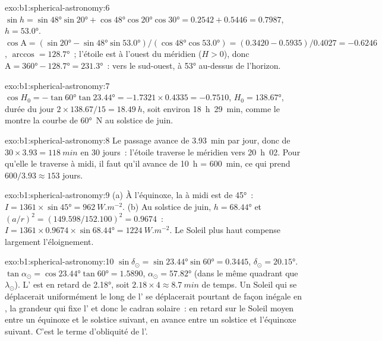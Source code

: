 \begin{solution}{exo:b1:spherical-astronomy:6}
$\sin h = \sin\ang{48}\sin\ang{20} + \cos\ang{48}\cos\ang{20}\cos\ang{30}
= 0.2542 + 0.5446 = 0.7987$, $h = \ang{53.0}$.
$\cos\mathrm{A} = (\sin\ang{20} - \sin\ang{48}\sin\ang{53.0})/(\cos\ang{48}
\cos\ang{53.0}) = (0.3420 - 0.5935)/0.4027 = -0.6246$, $\arccos = \ang{128.7}$~;
l'étoile est à l'ouest du méridien ($H > 0$), donc $\mathrm{A} = \ang{360} -
\ang{128.7} = \ang{231.3}$~: vers le sud-ouest, à \ang{53} au-dessus de l'horizon.
\end{solution}

\begin{solution}{exo:b1:spherical-astronomy:7}
$\cos H_0 = -\tan\ang{60}\tan\ang{23.44} = -1.7321\times0.4335 = -0.7510$,
$H_0 = \ang{138.67}$, durée du jour $2\times138.67/15 = \qty{18.49}{h}$, soit
environ \qty{18}{h}~\qty{29}{min}, comme le montre la courbe de \ang{60}~N au
solstice de juin.
\end{solution}

\begin{solution}{exo:b1:spherical-astronomy:8}
Le passage avance de \qty{3.93}{min} par jour, donc de $30\times3.93 =
\qty{118}{min}$ en 30 jours~: l'étoile traverse le méridien vers 20~h~02. Pour
qu'elle le traverse à midi, il faut qu'il avance de \qty{10}{h} = \qty{600}{min},
ce qui prend $600/3.93 \approx 153$ jours.
\end{solution}

\begin{solution}{exo:b1:spherical-astronomy:9}
(a) À l'équinoxe, la  à midi est de \ang{45}~: $I = 1361\times\sin\ang{45}
= \qty{962}{W.m^{-2}}$. (b) Au solstice de juin, $h = \ang{68.44}$ et
$(a/r)^2 = (149.598/152.100)^2 = 0.9674$~:
$I = 1361\times0.9674\times\sin\ang{68.44} = \qty{1224}{W.m^{-2}}$. Le Soleil
plus haut compense largement l'éloignement.
\end{solution}

\begin{solution}{exo:b1:spherical-astronomy:10}
$\sin\delta_\odot = \sin\ang{23.44}\sin\ang{60} = 0.3445$,
$\delta_\odot = \ang{20.15}$. $\tan\alpha_\odot = \cos\ang{23.44}\tan\ang{60}
= 1.5890$, $\alpha_\odot = \ang{57.82}$ (dans le même quadrant que
$\lambda_\odot$). L' est en retard de \ang{2.18}, soit
$2.18\times4 \approx
\qty{8.7}{min}$ de temps. Un Soleil qui se déplacerait uniformément le long de
l' se déplacerait pourtant de façon inégale en , la
grandeur qui fixe l' et donc le cadran solaire~: en retard sur le
Soleil moyen entre un équinoxe et le solstice suivant, en avance entre un
solstice et l'équinoxe suivant. C'est le terme d'obliquité de l'.
\end{solution}


